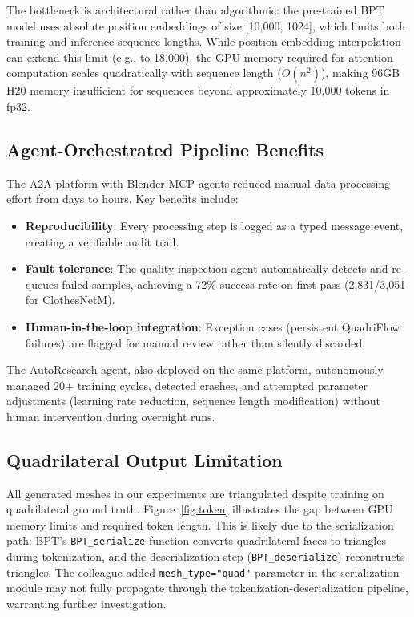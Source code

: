 \documentclass[conference]{IEEEtran}
\begin{document}
The bottleneck is architectural rather than algorithmic: the pre-trained BPT model uses absolute position embeddings of size [10,000, 1024], which limits both training and inference sequence lengths.
While position embedding interpolation can extend this limit (e.g., to 18,000), the GPU memory required for attention computation scales quadratically with sequence length ($O(n^2)$), making 96GB H20 memory insufficient for sequences beyond approximately 10,000 tokens in fp32.

\subsection{Agent-Orchestrated Pipeline Benefits}

The A2A platform with Blender MCP agents reduced manual data processing effort from days to hours.
Key benefits include:
\begin{itemize}
\item \textbf{Reproducibility}: Every processing step is logged as a typed message event, creating a verifiable audit trail.
\item \textbf{Fault tolerance}: The quality inspection agent automatically detects and re-queues failed samples, achieving a 72\% success rate on first pass (2,831/3,051 for ClothesNetM).
\item \textbf{Human-in-the-loop integration}: Exception cases (persistent QuadriFlow failures) are flagged for manual review rather than silently discarded.
\end{itemize}

The AutoResearch agent, also deployed on the same platform, autonomously managed 20+ training cycles, detected crashes, and attempted parameter adjustments (learning rate reduction, sequence length modification) without human intervention during overnight runs.

\subsection{Quadrilateral Output Limitation}

All generated meshes in our experiments are triangulated despite training on quadrilateral ground truth. Figure~\ref{fig:token} illustrates the gap between GPU memory limits and required token length.
This is likely due to the serialization path: BPT's \texttt{BPT\_serialize} function converts quadrilateral faces to triangles during tokenization, and the deserialization step (\texttt{BPT\_deserialize}) reconstructs triangles.
The colleague-added \texttt{mesh\_type="quad"} parameter in the serialization module may not fully propagate through the tokenization-deserialization pipeline, warranting further investigation.
\end{document}
